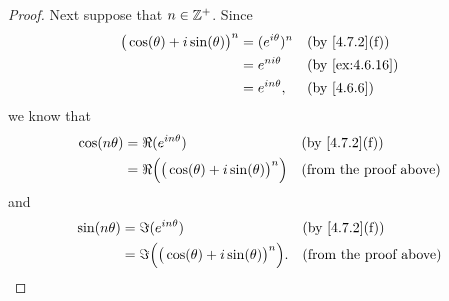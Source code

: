 \begin{proof}
  Next suppose that \(n \in \mathbb{Z}^+\).
  Since
  \begin{align*}
    \big(\cos(\theta) + i \sin(\theta)\big)^n & = (e^{i \theta})^n &  & \text{(by \cref{4.7.2}(f))}  \\
                                              & = e^{n i \theta}   &  & \text{(by \cref{ex:4.6.16})} \\
                                              & = e^{i n \theta},  &  & \text{(by \cref{4.6.6})}
  \end{align*}
  we know that
  \begin{align*}
    \cos(n \theta) & = \Re(e^{i n \theta})                                    &  & \text{(by \cref{4.7.2}(f))}   \\
                   & = \Re\Big(\big(\cos(\theta) + i \sin(\theta)\big)^n\Big) &  & \text{(from the proof above)}
  \end{align*}
  and
  \begin{align*}
    \sin(n \theta) & = \Im(e^{i n \theta})                                     &  & \text{(by \cref{4.7.2}(f))}   \\
                   & = \Im\Big(\big(\cos(\theta) + i \sin(\theta)\big)^n\Big). &  & \text{(from the proof above)}
  \end{align*}


\end{proof}
